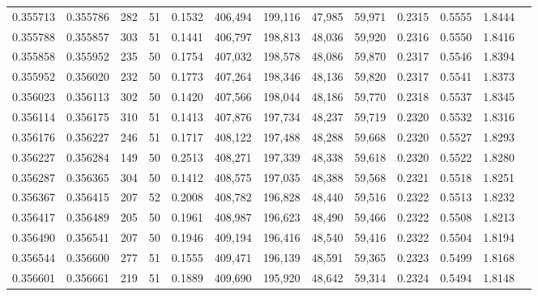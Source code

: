 \begin{tabular}{rrrrrrrrrrrrr}
0.355713 & 0.355786 &   282 &  51 &                                     0.1532 & 406,494 & 199,116 &  47,985 &  59,971 & 0.2315 & 0.5555 & 1.8444 \\
0.355788 & 0.355857 &   303 &  51 &                                     0.1441 & 406,797 & 198,813 &  48,036 &  59,920 & 0.2316 & 0.5550 & 1.8416 \\
0.355858 & 0.355952 &   235 &  50 &                                     0.1754 & 407,032 & 198,578 &  48,086 &  59,870 & 0.2317 & 0.5546 & 1.8394 \\
0.355952 & 0.356020 &   232 &  50 &                                     0.1773 & 407,264 & 198,346 &  48,136 &  59,820 & 0.2317 & 0.5541 & 1.8373 \\
0.356023 & 0.356113 &   302 &  50 &                                     0.1420 & 407,566 & 198,044 &  48,186 &  59,770 & 0.2318 & 0.5537 & 1.8345 \\
0.356114 & 0.356175 &   310 &  51 &                                     0.1413 & 407,876 & 197,734 &  48,237 &  59,719 & 0.2320 & 0.5532 & 1.8316 \\
0.356176 & 0.356227 &   246 &  51 &                                     0.1717 & 408,122 & 197,488 &  48,288 &  59,668 & 0.2320 & 0.5527 & 1.8293 \\
0.356227 & 0.356284 &   149 &  50 &                                     0.2513 & 408,271 & 197,339 &  48,338 &  59,618 & 0.2320 & 0.5522 & 1.8280 \\
0.356287 & 0.356365 &   304 &  50 &                                     0.1412 & 408,575 & 197,035 &  48,388 &  59,568 & 0.2321 & 0.5518 & 1.8251 \\
0.356367 & 0.356415 &   207 &  52 &                                     0.2008 & 408,782 & 196,828 &  48,440 &  59,516 & 0.2322 & 0.5513 & 1.8232 \\
0.356417 & 0.356489 &   205 &  50 &                                     0.1961 & 408,987 & 196,623 &  48,490 &  59,466 & 0.2322 & 0.5508 & 1.8213 \\
0.356490 & 0.356541 &   207 &  50 &                                     0.1946 & 409,194 & 196,416 &  48,540 &  59,416 & 0.2322 & 0.5504 & 1.8194 \\
0.356544 & 0.356600 &   277 &  51 &                                     0.1555 & 409,471 & 196,139 &  48,591 &  59,365 & 0.2323 & 0.5499 & 1.8168 \\
0.356601 & 0.356661 &   219 &  51 &                                     0.1889 & 409,690 & 195,920 &  48,642 &  59,314 & 0.2324 & 0.5494 & 1.8148 \\

\end{tabular}
